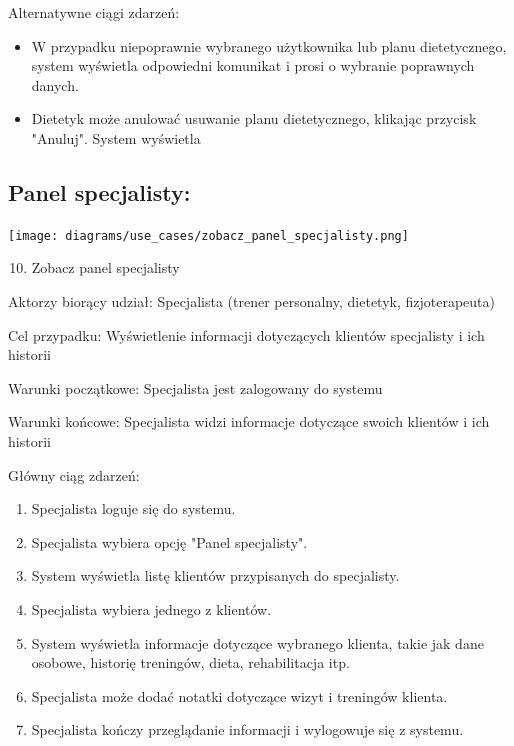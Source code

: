 \documentclass[
]{article}
\providecommand{\tightlist}{%
  \setlength{\itemsep}{0pt}\setlength{\parskip}{0pt}}
\begin{document}
{Alternatywne ciągi zdarzeń:}

\begin{itemize}
\tightlist
\item
  {W przypadku niepoprawnie wybranego użytkownika lub planu
  dietetycznego, system wyświetla odpowiedni komunikat i prosi o
  wybranie poprawnych danych.}
\item
  {Dietetyk może anulować usuwanie planu dietetycznego, klikając
  przycisk "Anuluj". System wyświetla}
\end{itemize}

\hypertarget{h.moo0g2hu8rf}{%
\subsection{\texorpdfstring{{}}{}}\label{h.moo0g2hu8rf}}

\hypertarget{h.8of6ai7v3sbh}{%
\subsection{\texorpdfstring{{Panel
specjalisty:}}{Panel specjalisty:}}\label{h.8of6ai7v3sbh}}

{\texttt{[image: diagrams/use\_cases/zobacz\_panel\_specjalisty.png]}}

\begin{enumerate}
\setcounter{enumi}{9}
\tightlist
\item
  {Zobacz panel specjalisty}
\end{enumerate}

{Aktorzy biorący udział: Specjalista (trener personalny, dietetyk,
fizjoterapeuta)}

{Cel przypadku: Wyświetlenie informacji dotyczących klientów specjalisty
i ich historii}

{Warunki początkowe: Specjalista jest zalogowany do systemu}

{Warunki końcowe: Specjalista widzi informacje dotyczące swoich klientów
i ich historii}

{Główny ciąg zdarzeń:}

\begin{enumerate}
\tightlist
\item
  {Specjalista loguje się do systemu.}
\item
  {Specjalista wybiera opcję "Panel specjalisty".}
\item
  {System wyświetla listę klientów przypisanych do specjalisty.}
\item
  {Specjalista wybiera jednego z klientów.}
\item
  {System wyświetla informacje dotyczące wybranego klienta, takie jak
  dane osobowe, historię treningów, dieta, rehabilitacja itp.}
\item
  {Specjalista może dodać notatki dotyczące wizyt i treningów klienta.}
\item
  {Specjalista kończy przeglądanie informacji i wylogowuje się z
  systemu.}
\end{enumerate}
\end{document}
